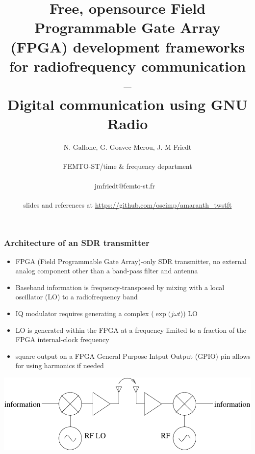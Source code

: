 \documentclass[compress,10pt,aspectratio=169]{beamer}
\begin{document}
\title{Free, opensource Field Programmable Gate Array (FPGA) development frameworks for radiofrequency communication -- \\Digital communication using GNU Radio}
\author{N. Gallone, G. Goavec-Merou, J.-M Friedt\\ \ \\ 
FEMTO-ST/time \& frequency department \\ \ \\ jmfriedt@femto-st.fr \ \\ \ \\
slides and references at \url{https://github.com/oscimp/amaranth_twstft}}
\maketitle


\begin{frame}\frametitle{Architecture of an SDR transmitter}

\begin{itemize}
\item FPGA (Field Programmable Gate Array)-only SDR transmitter, no external analog component other
than a band-pass filter and antenna
\item Baseband information is frequency-transposed by mixing with a local oscillator (LO) to a 
radiofrequency band
\item IQ modulator requires generating a complex ($\exp(j\omega t$)) LO
\item LO is generated within the FPGA at a frequency limited to a fraction of the FPGA internal-clock frequency
\item square output on a FPGA General Purpose Intput Output (GPIO) pin allows for using harmonics if needed
\end{itemize}

\begin{center}
\includegraphics[width=0.6\linewidth]{chaine}
\end{center}
\end{frame}
\end{document}
